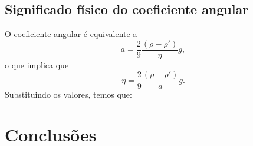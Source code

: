 \documentclass[12pt,a4paper]{article}
\begin{document}
\subsection{Significado físico do coeficiente angular}
O coeficiente angular  é equivalente a
$$a = \frac{2}{9} \frac{(\rho - \rho ')}{\eta}g,$$ 
o que implica que 
$$\eta = \frac{2}{9} \frac{(\rho - \rho ')}{a}g.$$
Substituindo os valores, temos que:



\section{Conclusões}
\end{document}
